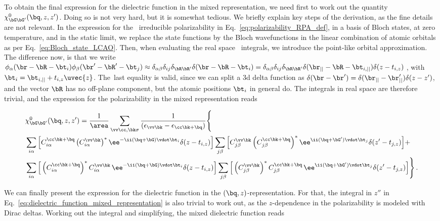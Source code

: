 To obtain the final expression for the dielectric function in the mixed representation, we need first to work out the quantity $\chi^{0}_{\bG \bG'}(\bq,z,z')$.
Doing so is not very hard, but it is somewhat tedious.
We briefly explain key steps of the derivation, as the fine details are not relevant.
In the expression for the \rpa~irreducible polarizability in Eq.~\eqref{eq:polarizability_RPA_def}, in a basis of Bloch states, at zero temperature, and in the static limit, we replace the state functions by the Bloch wavefunctions in the linear combination of atomic orbitals as per Eq.~\eqref{eq:Bloch_state_LCAO}.
Then, when evaluating the real space \bd~integrals, we introduce the point-like orbital approximation.
The difference now, is that we write $\phi_{\alpha}(\br - \bR - \bt_i ) \phi_{\beta}(\br' - \bR' - \bt_{j} ) \approx \delta_{\alpha \beta} \delta_{i j} \delta_{\bR \bR'} \delta(\br - \bR - \bt_{i}) = \delta_{\alpha \beta} \delta_{i j} \delta_{\bR \bR'} \delta(\br_{||} - \bR - \bt_{i,||}) \delta(z - t_{i,z})$\,, with $\bt_i = \bt_{i,||} + t_{i,z} \uvec{z}$.
The~last equality is valid, since we can split a \gls{3d} delta function as $\delta(\br - \br') = \delta(\br_{||} - \br'_{||}) \delta(z-z')$, and the vector $\bR$ has no off-plane component, but the atomic positions $\bt_{i}$ in general do.
The integrals in real space are therefore trivial, and the expression for the polarizability in the mixed representation reads

\begin{align}
    &\chi^{0}_{\bG \bG'}(\bq,z,z') =  \frac{1}{\area}\sum_{\vv \cc,\bk \sigma} \frac{1}{( \epsilon_{\vv\bk}-\epsilon_{\cc\bk+\bq })}\Bigg\{ \label{eq:mixed_polarizability} \\
    &\sum_{i\alpha}\Big[C_{i\alpha}^{\cc\bk+\bq }\left(C_{i\alpha}^{\vv\bk}\right)^{*} \ee^{-\ii (\bq +\bG) \vdot\bt_{i}} \delta(z - t_{i,z}) \Big] \sum_{j\beta}\Big[C_{j\beta}^{\vv\bk}\left(C_{j\beta}^{\cc\bk+\bq }\right)^{*} \ee^{\ii (\bq +\bG') \vdot \bt_{j}} \delta(z' - t_{j,z}) \Big] + \notag\\
    &\sum_{i\alpha}\Big[\left(C_{i\alpha}^{\cc\bk+\bq }\right)^{*}C_{i\alpha}^{\vv\bk}\, \ee^{-\ii (\bq +\bG) \vdot\bt_{i}} \delta(z - t_{i,z}) \Big] \sum_{j\beta} \Big[\left(C_{j\beta}^{\vv\bk}\right)^{*}C_{j\beta}^{\cc\bk+\bq }\, \ee^{\ii (\bq +\bG') \vdot \bt_{j}} \delta(z' - t_{j,z})\Big]\Bigg\}\,. \notag
\end{align}

We can finally present the expression for the dielectric function in the $(\bq,z)$-representation.
For that, the integral in $z''$ in Eq.~\eqref{eq:dielectric_function_mixed_representation} is also trivial to work out, as the $z$-dependence in the polarizability is modeled with Dirac deltas.
Working out the integral and simplifying, the mixed dielectric function reads

